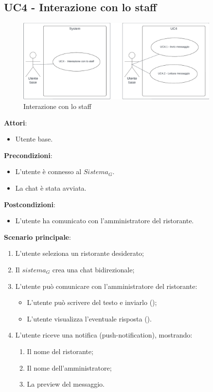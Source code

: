 \subsection{UC4 - Interazione con lo staff}\label{usecase:4}
\begin{figure}[H]
  \centering
  \includegraphics[width=0.9\textwidth]{ucd/UCD4.png}
  \caption{Interazione con lo staff}
\end{figure}
\textbf{Attori}:
\begin{itemize}
    \item Utente base.
\end{itemize}
\textbf{Precondizioni}:
\begin{itemize}
    \item L'utente è connesso al $\textit{Sistema}_G$.
     \item La chat è stata avviata.
\end{itemize}
\textbf{Postcondizioni}:
\begin{itemize}
    \item L'utente ha comunicato con l'amministratore del ristorante.
\end{itemize}
\textbf{Scenario principale}:
\begin{enumerate}
    \item L'utente seleziona un ristorante desiderato;
    \item Il $\textit{sistema}_G$ crea una chat bidirezionale;
    \item L'utente può comunicare con l'amministratore del ristorante:
    \begin{itemize}
        \item L'utente può scrivere del testo e inviarlo ();
        \item L'utente visualizza l'eventuale risposta ().
    \end{itemize}
    \item L'utente riceve una notifica (push-notification), mostrando:
    \begin{enumerate}
        \item Il nome del ristorante;
        \item Il nome dell'amministratore;
        \item La preview del messaggio.
    \end{enumerate}
\end{enumerate}
